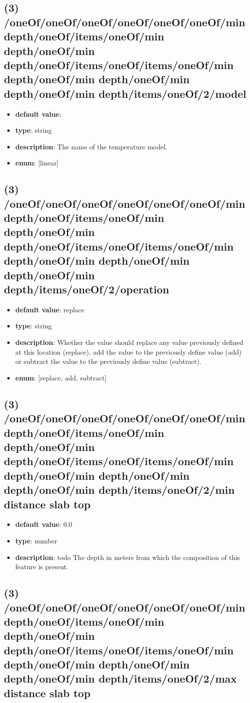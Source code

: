 \subsection{(3) /oneOf/oneOf/oneOf/oneOf/oneOf/oneOf/min depth/oneOf/items/oneOf/min depth/oneOf/min depth/oneOf/items/oneOf/items/oneOf/min depth/oneOf/min depth/oneOf/min depth/oneOf/min depth/items/oneOf/2/model}
\begin{itemize}[leftmargin=3em]\item {\bf default value}: 
\item {\bf type}: string
\item {\bf description}: The name of the temperature model.
\item {\bf enum}: [linear]\end{itemize}\subsection{(3) /oneOf/oneOf/oneOf/oneOf/oneOf/oneOf/min depth/oneOf/items/oneOf/min depth/oneOf/min depth/oneOf/items/oneOf/items/oneOf/min depth/oneOf/min depth/oneOf/min depth/oneOf/min depth/items/oneOf/2/operation}
\begin{itemize}[leftmargin=3em]\item {\bf default value}: replace
\item {\bf type}: string
\item {\bf description}: Whether the value should replace any value previously defined at this location (replace), add the value to the previously define value (add) or subtract the value to the previously define value (subtract).
\item {\bf enum}: [replace, add, subtract]\end{itemize}\subsection{(3) /oneOf/oneOf/oneOf/oneOf/oneOf/oneOf/min depth/oneOf/items/oneOf/min depth/oneOf/min depth/oneOf/items/oneOf/items/oneOf/min depth/oneOf/min depth/oneOf/min depth/oneOf/min depth/items/oneOf/2/min distance slab top}
\begin{itemize}[leftmargin=3em]\item {\bf default value}: 0.0
\item {\bf type}: number
\item {\bf description}: todo The depth in meters from which the composition of this feature is present.
\end{itemize}\subsection{(3) /oneOf/oneOf/oneOf/oneOf/oneOf/oneOf/min depth/oneOf/items/oneOf/min depth/oneOf/min depth/oneOf/items/oneOf/items/oneOf/min depth/oneOf/min depth/oneOf/min depth/oneOf/min depth/items/oneOf/2/max distance slab top}
